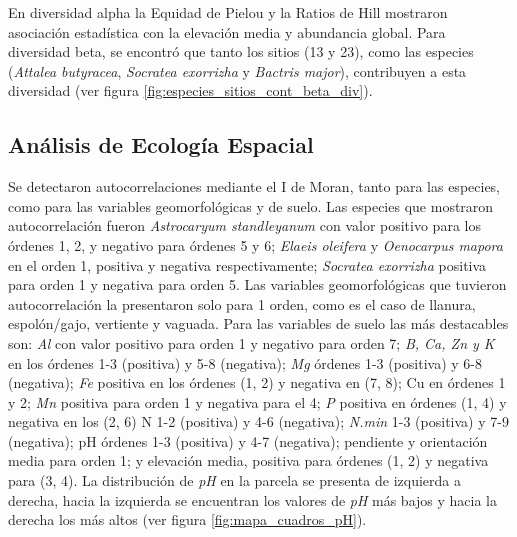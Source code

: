 \documentclass[11pt,]{article}
\begin{document}
En diversidad alpha la Equidad de Pielou y la Ratios de Hill mostraron
asociación estadística con la elevación media y abundancia global. Para
diversidad beta, se encontró que tanto los sitios (13 y 23), como las
especies (\emph{Attalea butyracea}, \emph{Socratea exorrizha} y
\emph{Bactris major}), contribuyen a esta diversidad (ver figura
\ref{fig:especies_sitios_cont_beta_div}).

\subsection{Análisis de Ecología
Espacial}\label{anuxe1lisis-de-ecologuxeda-espacial-1}

Se detectaron autocorrelaciones mediante el I de Moran, tanto para las
especies, como para las variables geomorfológicas y de suelo. Las
especies que mostraron autocorrelación fueron \emph{Astrocaryum
standleyanum} con valor positivo para los órdenes 1, 2, y negativo para
órdenes 5 y 6; \emph{Elaeis oleifera} y \emph{Oenocarpus mapora} en el
orden 1, positiva y negativa respectivamente; \emph{Socratea exorrizha}
positiva para orden 1 y negativa para orden 5. Las variables
geomorfológicas que tuvieron autocorrelación la presentaron solo para 1
orden, como es el caso de llanura, espolón/gajo, vertiente y vaguada.
Para las variables de suelo las más destacables son: \emph{Al} con valor
positivo para orden 1 y negativo para orden 7; \emph{B, Ca, Zn y K} en
los órdenes 1-3 (positiva) y 5-8 (negativa); \emph{Mg} órdenes 1-3
(positiva) y 6-8 (negativa); \emph{Fe} positiva en los órdenes (1, 2) y
negativa en (7, 8); Cu en órdenes 1 y 2; \emph{Mn} positiva para orden 1
y negativa para el 4; \emph{P} positiva en órdenes (1, 4) y negativa en
los (2, 6) N 1-2 (positiva) y 4-6 (negativa); \emph{N.min} 1-3
(positiva) y 7-9 (negativa); pH órdenes 1-3 (positiva) y 4-7 (negativa);
pendiente y orientación media para orden 1; y elevación media, positiva
para órdenes (1, 2) y negativa para (3, 4). La distribución de \emph{pH}
en la parcela se presenta de izquierda a derecha, hacia la izquierda se
encuentran los valores de \emph{pH} más bajos y hacia la derecha los más
altos (ver figura \ref{fig:mapa_cuadros_pH}).
\end{document}
